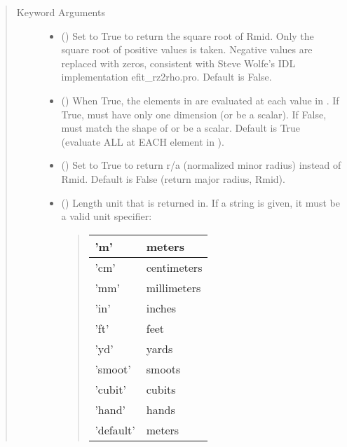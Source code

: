 \documentclass[letterpaper,10pt,english]{sphinxmanual}
\begin{document}
\begin{fulllineitems}
\begin{fulllineitems}
\begin{quote}
\begin{description}
\begin{itemize}
\end{itemize}

\item[{Keyword Arguments}] \leavevmode\begin{itemize}
\item {} 
 () \textendash{} Set to True to return the square root of Rmid.
Only the square root of positive values is taken. Negative
values are replaced with zeros, consistent with Steve Wolfe’s
IDL implementation efit\_rz2rho.pro. Default is False.

\item {} 
 () \textendash{} When True, the elements in  are evaluated
at each value in . If True,  must have only one dimension
(or be a scalar). If False,  must match the shape of 
or be a scalar. Default is True (evaluate ALL  at EACH
element in ).

\item {} 
 () \textendash{} Set to True to return r/a (normalized minor radius)
instead of Rmid. Default is False (return major radius, Rmid).

\item {} 
 () \textendash{} 
Length unit that  is returned in.
If a string is given, it must be a valid unit specifier:
\begin{quote}


\begin{savenotes}\sphinxattablestart
\centering
\begin{tabulary}{\linewidth}[t]{|T|T|}
\hline

’m’
&
meters
\\
\hline
’cm’
&
centimeters
\\
\hline
’mm’
&
millimeters
\\
\hline
’in’
&
inches
\\
\hline
’ft’
&
feet
\\
\hline
’yd’
&
yards
\\
\hline
’smoot’
&
smoots
\\
\hline
’cubit’
&
cubits
\\
\hline
’hand’
&
hands
\\
\hline
’default’
&
meters
\\
\hline
\end{tabulary}
\par
\sphinxattableend\end{savenotes}
\end{quote}


\end{itemize}
\end{description}
\end{quote}
\end{fulllineitems}
\end{fulllineitems}
\end{document}
